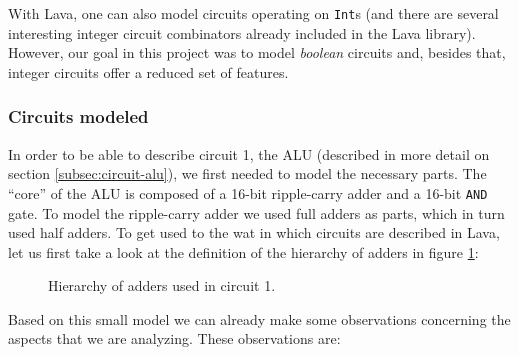 \documentclass[a4paper]{article}
\begin{document}
            With Lava, one can also model circuits operating on \texttt{Int}s (and there are several
            interesting integer circuit combinators already included in the Lava library). However,
            our goal in this project was to model \emph{boolean} circuits and, besides that, integer
            circuits offer a reduced set of features.


            \subsubsection{Circuits modeled}
            \label{subsubsec:lava-circuits}
                In order to be able to describe circuit 1, the ALU (described in more detail on
                section \ref{subsec:circuit-alu}), we first needed to model the necessary
                parts. The ``core'' of the ALU is composed of a 16-bit ripple-carry adder and
                a 16-bit \texttt{AND} gate. To model the ripple-carry adder we used full adders as
                parts, which in turn used half adders. To get used to the wat in which
                circuits are described in Lava, let us first take a look at the definition of the
                hierarchy of adders in figure \ref{fig:lava-circuit1-model-adders}:

                \begin{figure}[h!]
                    \begin{center}
                    \end{center}
                    \caption{Hierarchy of adders used in circuit 1.
                        \label{fig:lava-circuit1-model-adders}}
                \end{figure}

                Based on this small model we can already make some observations concerning the
                aspects that we are analyzing. These observations are:
\end{document}
